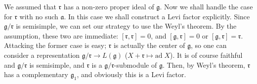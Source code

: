 \documentclass{article}
\newcommand{\lie}[1]{\mathfrak{#1}}
\newcommand{\ad}[1]{\mathrm{ad}\; #1}
\begin{document}
We assumed that $\lie{r}$ has a non-zero proper ideal of $\lie{g}$.
Now we shall handle the case for $\lie{r}$ with no such $\lie{a}$.
In this case we shall construct a Levi factor explicitly.
Since $\lie{g}/\lie{r}$ is semisimple, we can set our strategy to use the Weyl's theorem.
By the assumption, these two are immediate: $[\lie{r}, \lie{r}] = 0$, and $[\lie{g}, \lie{r}] = 0$ or $[\lie{g}, \lie{r}] = \lie{r}$.
Attacking the former case is easy; $\lie{r}$ is actually the center of $\lie{g}$, so one can consider a representation $\lie{g}/\lie{r} \to L(\lie{g})$ ($X + \lie{r} \mapsto \ad{X}$).
It is of course faithful and $\lie{g}/\lie{r}$ is semisimple, and $\lie{r}$ is a $\lie{g}/\lie{r}$-submodule of $\lie{g}$.
Then, by Weyl's theorem, $\lie{r}$ has a complementary $\lie{g}_1$, and obviously this is a Levi factor.
\end{document}
